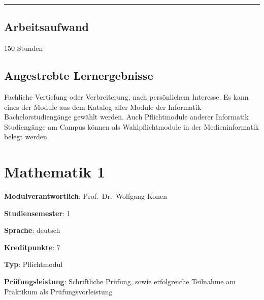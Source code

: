 \begin{center}\rule{0.5\linewidth}{0.5pt}\end{center}

\hypertarget{arbeitsaufwandpathlabel....srcmodulbeschreibungen-bachelor-bpo5ba_mi-wpf-2}{%
\section*{Arbeitsaufwand\label{../../src/modulbeschreibungen-bachelor-bpo5/BA_MI-WPF-2}}\label{arbeitsaufwandpathlabel....srcmodulbeschreibungen-bachelor-bpo5ba_mi-wpf-2}}

150 Stunden

\hypertarget{angestrebte-lernergebnissepathlabel....srcmodulbeschreibungen-bachelor-bpo5ba_mi-wpf-2}{%
\section*{Angestrebte
Lernergebnisse\label{../../src/modulbeschreibungen-bachelor-bpo5/BA_MI-WPF-2}}\label{angestrebte-lernergebnissepathlabel....srcmodulbeschreibungen-bachelor-bpo5ba_mi-wpf-2}}

Fachliche Vertiefung oder Verbreiterung, nach persönlichem Interesse. Es
kann eines der Module aus dem Katalog aller Module der Informatik
Bachelorstudiengänge gewählt werden. Auch Pflichtmodule anderer
Informatik Studiengänge am Campus können als Wahlpflichtmodule in der
Medieninformatik belegt werden.

\hypertarget{mathematik-1pathlabel....srcmodulbeschreibungen-bachelor-bpo5ba_mathematik1}{%
\chapter{Mathematik
1\label{../../src/modulbeschreibungen-bachelor-bpo5/BA_Mathematik1}}\label{mathematik-1pathlabel....srcmodulbeschreibungen-bachelor-bpo5ba_mathematik1}}

\begin{modulHead}
\textbf{Modulverantwortlich}: Prof.~Dr.~Wolfgang
Konen
\end{modulHead}
\begin{modulHead}
\textbf{Studiensemester}:
1
\end{modulHead}
\begin{modulHead}
\textbf{Sprache}:
deutsch
\end{modulHead}
\begin{modulHead}
\textbf{Kreditpunkte}:
7
\end{modulHead}
\begin{modulHead}
\textbf{Typ}:
Pflichtmodul
\end{modulHead}
\begin{modulHead}
\textbf{Prüfungsleistung}:
Schriftliche Prüfung, sowie erfolgreiche Teilnahme am Praktikum als
Prüfungsvorleistung
\end{modulHead}


